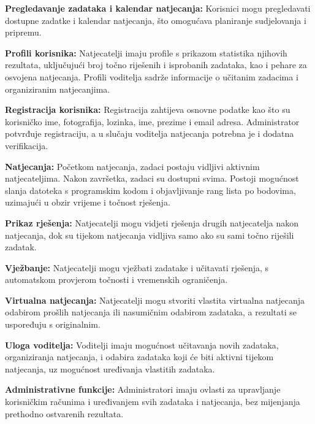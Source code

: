 		\begin{packed_item}
    	\item \textbf{Pregledavanje zadataka i kalendar natjecanja:} 
		Korisnici mogu pregledavati dostupne zadatke i kalendar natjecanja, 
		što omogućava planiranje sudjelovanja i pripremu.
    	\item \textbf{Profili korisnika:} Natjecatelji imaju profile s 
		prikazom statistika njihovih rezultata, uključujući broj točno 
		riješenih i isprobanih zadataka, kao i pehare za osvojena natjecanja.
		Profili voditelja sadrže informacije o učitanim zadacima i 
		organiziranim natjecanjima.
 		\item \textbf{Registracija korisnika:} Registracija zahtijeva 
		osnovne podatke kao što su korisničko ime, fotografija, lozinka, 
		ime, prezime i email adresa. Administrator potvrđuje registraciju,
		a u slučaju voditelja natjecanja potrebna je i dodatna verifikacija.
    	\item \textbf{Natjecanja:} Početkom natjecanja, zadaci postaju 
		vidljivi aktivnim natjecateljima. Nakon završetka, zadaci su
		dostupni svima. Postoji mogućnost slanja datoteka s programskim
		kodom i objavljivanje rang lista po bodovima, uzimajući u
		obzir vrijeme i točnost rješenja.
    	\item \textbf{Prikaz rješenja:} Natjecatelji mogu vidjeti 
		rješenja drugih natjecatelja nakon natjecanja, dok su tijekom 
		natjecanja vidljiva samo ako su sami točno riješili zadatak.
    	\item \textbf{Vježbanje:} Natjecatelji mogu vježbati zadatake i 
		učitavati rješenja, s automatskom provjerom točnosti i vremenskih ograničenja.
   		\item \textbf{Virtualna natjecanja:} Natjecatelji mogu stvoriti 
		vlastita virtualna natjecanja odabirom prošlih natjecanja ili 
		nasumičnim odabirom zadataka, a rezultati se uspoređuju s originalnim.
    	\item \textbf{Uloga voditelja:} Voditelji imaju mogućnost učitavanja 
		novih zadataka, organiziranja natjecanja, i odabira zadataka koji će 
		biti aktivni tijekom natjecanja, uz mogućnost uređivanja vlastitih zadataka.
   		\item \textbf{Administrativne funkcije:} Administratori imaju ovlasti 
		za upravljanje korisničkim računima i uređivanjem svih zadataka i 
		natjecanja, bez mijenjanja prethodno ostvarenih rezultata.\\
		\end{packed_item}


